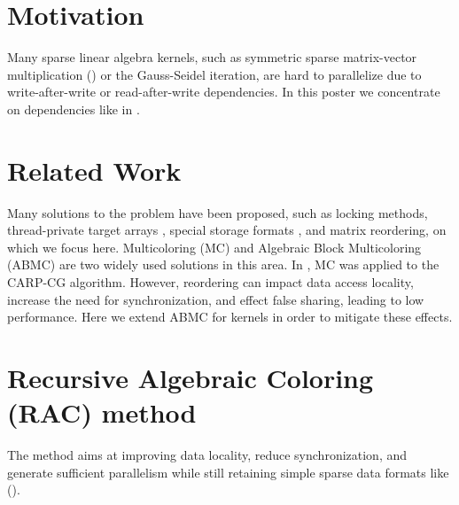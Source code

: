 \section{Motivation}

Many sparse linear algebra kernels, such as symmetric sparse
matrix-vector multiplication (\SymmSpmv) or the Gauss-Seidel iteration, are hard
to parallelize due to write-after-write or read-after-write
dependencies.  In this poster we concentrate on \DTWO dependencies
like in \SymmSpmv. 

\section{Related Work}

Many solutions to the \DTWO problem have been proposed, such as
locking methods, thread-private target arrays
\cite{thread_private_symm_spmv}, special storage formats
\cite{CSB,RSB}, and matrix reordering, on which we focus
here. Multicoloring (MC) \cite{MC,COLPACK} and Algebraic Block
Multicoloring (ABMC) \cite{ABMC} are two widely used solutions in this
area. In \cite{feast_mc}, MC was applied to the CARP-CG
algorithm. However, reordering can impact data access locality,
increase the need for synchronization, and effect false sharing,
leading to low performance. Here we extend ABMC for \DTWO kernels in
order to mitigate these effects.


\section{Recursive Algebraic Coloring (RAC) method}

The method aims at improving data locality, reduce synchronization, and
generate sufficient parallelism while still retaining simple sparse
data formats like \CRSfull (\CRS).

